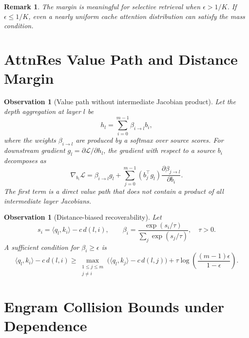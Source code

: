 \documentclass[preprint,12pt]{elsarticle}
\newtheorem{remark}[theorem]{Remark}
\newtheorem{observation}[theorem]{Observation}
\begin{document}
\begin{remark}
The margin is meaningful for selective retrieval when $\epsilon>1/K$. If $\epsilon\leq 1/K$, even a nearly uniform cache attention distribution can satisfy the mass condition.
\end{remark}

\section{AttnRes Value Path and Distance Margin}
\label{app:attnres-margin}

\begin{observation}[Value path without intermediate Jacobian product]
Let the depth aggregation at layer $l$ be
\begin{equation}
h_l=\sum_{i=0}^{m-1}\beta_{i\to l}b_i,
\end{equation}
where the weights $\beta_{i\to l}$ are produced by a softmax over source scores. For downstream gradient $g_l=\partial \mathcal{L}/\partial h_l$, the gradient with respect to a source $b_i$ decomposes as
\begin{equation}
\nabla_{b_i}\mathcal{L}
=\beta_{i\to l}g_l + \sum_{j=0}^{m-1}(b_j^\top g_l)\frac{\partial \beta_{j\to l}}{\partial b_i}.
\end{equation}
The first term is a direct value path that does not contain a product of all intermediate layer Jacobians.
\end{observation}



\begin{observation}[Distance-biased recoverability]
\label{prop:attnres-margin}
Let
\begin{equation}
s_i=\langle q_l,k_i\rangle-c\,d(l,i),\qquad
\beta_i=\frac{\exp(s_i/\tau)}{\sum_{j}\exp(s_j/\tau)},\quad \tau>0.
\end{equation}
A sufficient condition for $\beta_i\geq\epsilon$ is
\begin{equation}
\langle q_l,k_i\rangle-c\,d(l,i)
\geq
\max_{\substack{1\le j\le m\\ j\ne i}}\big(\langle q_l,k_j\rangle-c\,d(l,j)\big)
+\tau\log\left(\frac{(m-1)\epsilon}{1-\epsilon}\right).
\end{equation}
\end{observation}



\section{Engram Collision Bounds under Dependence}
\label{app:engram}
\end{document}
